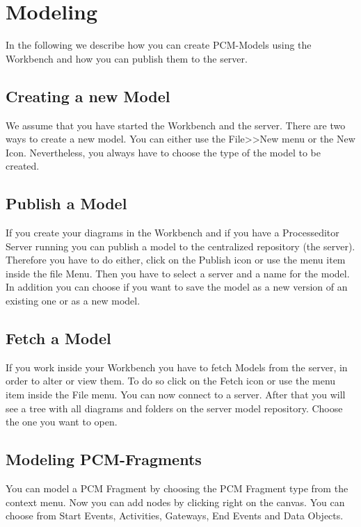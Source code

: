 
\section{Modeling}

In the following we describe how you can create PCM-Models using the Workbench and how you can publish them to the server.

\subsection{Creating a new Model}

We assume that you have started the Workbench and the server. There are two ways to create a new model.
You can either use the File\textgreater\textgreater New menu or the New Icon.
Nevertheless, you always have to choose the type of the model to be created.

\subsection{Publish a Model}

If you create your diagrams in the Workbench and if you have a Processeditor Server running you can publish a model to the centralized repository (the server).
Therefore you have to do either, click on the Publish icon or use the menu item inside the file Menu.
Then you have to select a server and a name for the model.
In addition you can choose if you want to save the model as a new version of an existing one or as a new model.

\subsection{Fetch a Model}

If you work inside your Workbench you have to fetch Models from the server, in order to alter or view them.
To do so click on the Fetch icon or use the menu item inside the File menu.
You can now connect to a server.
After that you will see a tree with all diagrams and folders on the server model repository.
Choose the one you want to open.

\subsection{Modeling PCM-Fragments}

You can model a PCM Fragment by choosing the PCM Fragment type from the context menu. Now you can add nodes by clicking right on the canvas. You can choose from Start Events, Activities, Gateways, End Events and Data Objects.

